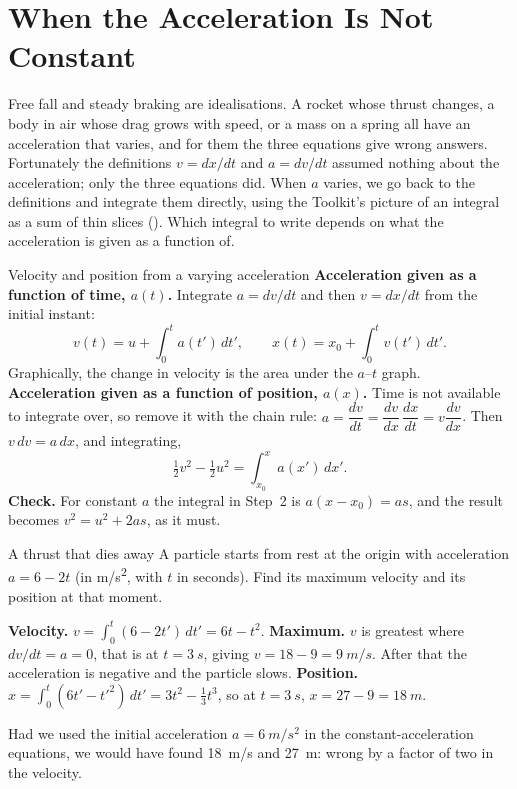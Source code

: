 \section{When the Acceleration Is Not Constant}\label{sec:varacc}

Free fall and steady braking are idealisations. A rocket whose thrust changes, a body in air whose drag
grows with speed, or a mass on a spring all have an acceleration that varies, and for them the three
equations give wrong answers. Fortunately the definitions $v=dx/dt$ and $a=dv/dt$ assumed nothing about
the acceleration; only the three equations
did. When $a$ varies, we go back to the definitions and integrate them directly, using the Toolkit's
picture of an integral as a sum of thin slices (). Which integral to write depends on
what the acceleration is given as a function of.

\begin{derivbox}{Velocity and position from a varying acceleration}
 \textbf{Acceleration given as a function of time, $a(t)$.} Integrate $a=dv/dt$ and then
$v=dx/dt$ from the initial instant:
\[
v(t)=u+\int_0^t a(t')\,dt',\qquad x(t)=x_0+\int_0^t v(t')\,dt'.
\]
Graphically, the change in velocity is the area under the $a$--$t$ graph.
 \textbf{Acceleration given as a function of position, $a(x)$.} Time is not available to
integrate over, so remove it with the chain rule:
$a=\dfrac{dv}{dt}=\dfrac{dv}{dx}\,\dfrac{dx}{dt}=v\dfrac{dv}{dx}$. Then $v\,dv=a\,dx$, and integrating,
\[
\tfrac12v^2-\tfrac12u^2=\int_{x_0}^{x}a(x')\,dx'.
\]
 \textbf{Check.} For constant $a$ the integral in Step~2 is $a(x-x_0)=as$, and the result
becomes $v^2=u^2+2as$, as it must.
\end{derivbox}

\begin{exbox}{A thrust that dies away}
A particle starts from rest at the origin with acceleration $a=6-2t$ (in \si{m/s^2}, with $t$ in
seconds). Find its maximum velocity and its position at that moment.

 \textbf{Velocity.} $v=\int_0^t(6-2t')\,dt'=6t-t^2$.
 \textbf{Maximum.} $v$ is greatest where $dv/dt=a=0$, that is at $t=\SI{3}{s}$, giving
$v=18-9=\SI{9}{m/s}$. After that the acceleration is negative and the particle slows.
 \textbf{Position.} $x=\int_0^t(6t'-t'^2)\,dt'=3t^2-\tfrac13t^3$, so at $t=\SI{3}{s}$,
$x=27-9=\SI{18}{m}$.

Had we used the initial acceleration $a=\SI{6}{m/s^2}$ in the constant-acceleration equations, we would
have found \SI{18}{m/s} and \SI{27}{m}: wrong by a factor of two in the velocity. 
\end{exbox}

